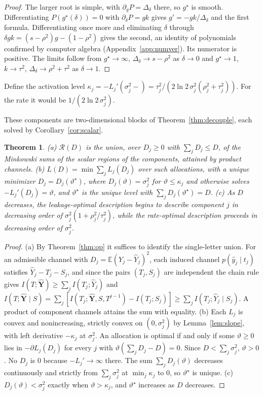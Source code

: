 \documentclass[11pt,onecolumn]{IEEEtran}
\newtheorem{theorem}{Theorem}
\newcommand{\E}{\mathbb{E}}
\newcommand{\hY}{\hat{\mathbf Y}}
\newcommand{\RW}{\mathcal{R}}
\begin{document}
\begin{proof}
The larger root is simple, with $\partial_gP=\Delta_\delta$ there, so
$g^\star$ is smooth. Differentiating $P(g^\star(\delta))=0$ with
$\partial_\delta P=gk$ gives $g'=-gk/\Delta_\delta$ and the first formula.
Differentiating once more and eliminating $\delta$ through
$\delta gk=(s-\rho^2)g-(1-\rho^2)$ gives the second, an identity of
polynomials confirmed by computer algebra (Appendix~\ref{app:numver}).
Its numerator is positive. The limits follow from $g^\star\to\infty$,
$\Delta_\delta\to s-\rho^2$ as $\delta\to0$ and $g^\star\to1$, $k\to\tau^2$,
$\Delta_\delta\to\rho^2+\tau^2$ as $\delta\to1$.
\end{proof}

Define the activation level
$\kappa_j=-L_j'(\sigma_j^2-)=\tau_j^2/(2\ln2\,\sigma_j^2(\rho_j^2+\tau_j^2))$.
For the rate it would be $1/(2\ln2\,\sigma_j^2)$.

These components are two-dimensional blocks of Theorem~\ref{thm:decouple},
each solved by Corollary~\ref{cor:scalar}.

\begin{theorem}\label{thm:parallel}
(a) $\RW(D)$ is the union, over $D_j\ge0$ with $\sum_jD_j\le D$, of the
Minkowski sums of the scalar regions of the components, attained by
product channels.
(b) $L(D)=\min\sum_jL_j(D_j)$ over such allocations, with a unique
minimizer $D_j=D_j(\vartheta^\star)$, where $D_j(\vartheta)=\sigma_j^2$ for
$\vartheta\le\kappa_j$ and otherwise solves $-L_j'(D_j)=\vartheta$, and
$\vartheta^\star$ is the unique level with $\sum_jD_j(\vartheta^\star)=D$.
(c) As $D$ decreases, the leakage-optimal description begins to describe
component $j$ in decreasing order of $\sigma_j^2(1+\rho_j^2/\tau_j^2)$,
while the rate-optimal description proceeds in decreasing order of
$\sigma_j^2$.
\end{theorem}

\begin{proof}
(a) By Theorem~\ref{thm:op} it suffices to identify the single-letter
union. For an admissible channel with $D_j=\E(Y_j-\hat Y_j)^2$, each
induced channel $p(\hat y_j\mid t_j)$ satisfies $\hat Y_j-T_j-S_j$, and
since the pairs $(T_j,S_j)$ are independent the chain rule gives
$I(T;\hY)\ge\sum_jI(T_j;\hat Y_j)$ and
$I(T;\hY\mid S)=\sum_j[I(T_j;\hY,S,T^{j-1})-I(T_j;S_j)]\ge\sum_jI(T_j;\hat Y_j\mid S_j)$.
A product of component channels attains the sum with equality.
(b) Each $L_j$ is convex and nonincreasing, strictly convex on
$(0,\sigma_j^2)$ by Lemma~\ref{lem:slope}, with left derivative
$-\kappa_j$ at $\sigma_j^2$. An allocation is optimal if and only if some
$\vartheta\ge0$ lies in $-\partial L_j(D_j)$ for every $j$ with
$\vartheta(\sum_jD_j-D)=0$. Since $D<\sum_j\sigma_j^2$, $\vartheta>0$. No $D_j$
is $0$ because $-L_j'\to\infty$ there. The sum $\sum_jD_j(\vartheta)$ decreases
continuously and strictly from $\sum_j\sigma_j^2$ at $\min_j\kappa_j$ to
$0$, so $\vartheta^\star$ is unique. (c) $D_j(\vartheta)<\sigma_j^2$ exactly when
$\vartheta>\kappa_j$, and $\vartheta^\star$ increases as $D$ decreases.
\end{proof}
\end{document}
